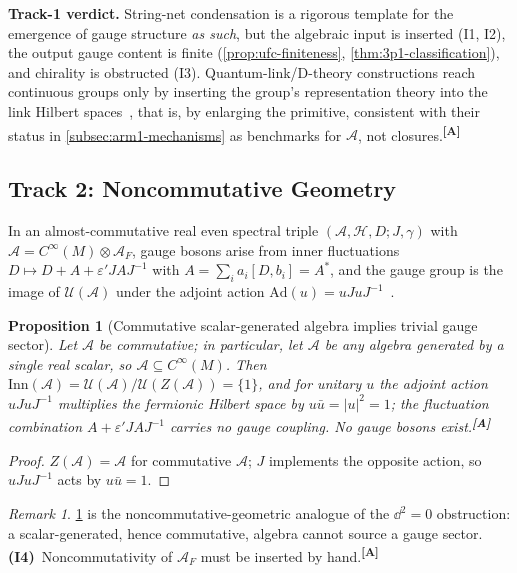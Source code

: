 \documentclass[12pt,a4paper,twoside]{article}
\theoremstyle{plain}
\newtheorem{proposition}[theorem]{Proposition}
\theoremstyle{definition}
\theoremstyle{remark}
\newtheorem{remark}[theorem]{Remark}
\newcommand{\catmark}[1]{\textsuperscript{\textsf{\textbf{[#1]}}}}
\begin{document}
\noindent\textbf{Track-1 verdict.} String-net condensation is a rigorous
template for the emergence of gauge structure \emph{as such}, but the
algebraic input is inserted (I1, I2), the output gauge content is finite
(\cref{prop:ufc-finiteness}, \cref{thm:3p1-classification}), and chirality
is obstructed (I3). Quantum-link/D-theory constructions reach continuous
groups only by inserting the group's representation theory into the link
Hilbert spaces~\cite{brower1999,wiese2022}, that is, by enlarging the
primitive, consistent with their status in
\cref{subsec:arm1-mechanisms} as benchmarks for $\mathcal{A}$, not
closures.\catmark{A}

\subsection{Track 2: Noncommutative Geometry}
\label{app:track2}

In an almost-commutative real even spectral triple
$(\mathcal{A},\mathcal{H},D;J,\gamma)$ with
$\mathcal{A}=C^\infty(M)\otimes\mathcal{A}_F$, gauge bosons arise from inner
fluctuations $D\mapsto D+A+\varepsilon' JAJ^{-1}$ with
$A=\sum_i a_i[D,b_i]=A^{*}$, and the gauge group is the image of
$\mathcal{U}(\mathcal{A})$ under the adjoint action
$\mathrm{Ad}(u)=uJuJ^{-1}$~\cite{chamseddine1997,connes2013}.

\begin{proposition}[Commutative scalar-generated algebra implies trivial gauge sector]
\label{prop:commutative-trivial}
Let $\mathcal{A}$ be commutative; in particular, let $\mathcal{A}$ be any
algebra generated by a single real scalar, so
$\mathcal{A}\subseteq C^\infty(M)$. Then
$\mathrm{Inn}(\mathcal{A})=\mathcal{U}(\mathcal{A})/\mathcal{U}(Z(\mathcal{A}))=\{1\}$,
and for unitary $u$ the adjoint action $uJuJ^{-1}$ multiplies the fermionic
Hilbert space by $u\bar{u}=\lvert u\rvert^{2}=1$; the fluctuation
combination $A+\varepsilon' JAJ^{-1}$ carries no gauge coupling. No gauge
bosons exist.\catmark{A}
\end{proposition}

\begin{proof}
$Z(\mathcal{A})=\mathcal{A}$ for commutative $\mathcal{A}$; $J$ implements
the opposite action, so $uJuJ^{-1}$ acts by $u\bar{u}=1$.
\end{proof}

\begin{remark}
\cref{prop:commutative-trivial} is the noncommutative-geometric analogue of
the $\dd^{2}=0$ obstruction: a scalar-generated, hence commutative, algebra
cannot source a gauge sector. \textbf{(I4)}~Noncommutativity of
$\mathcal{A}_F$ must be inserted by hand.\catmark{A}
\end{remark}
\end{document}
